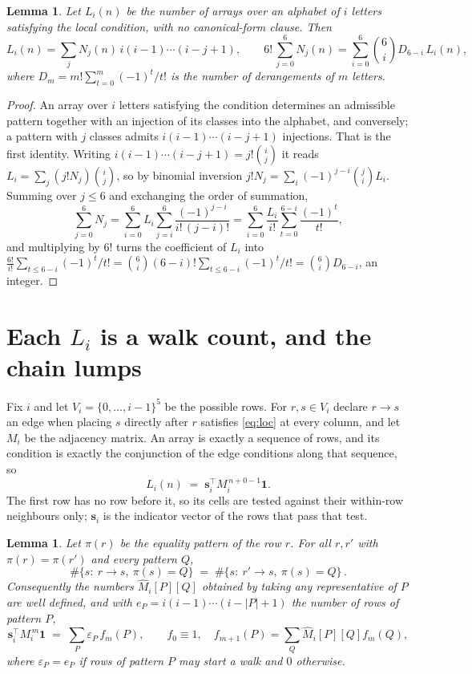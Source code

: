 \documentclass[11pt,a4paper]{article}
\theoremstyle{plain}
\newtheorem{lemma}[theorem]{Lemma}
\theoremstyle{definition}
\begin{document}
\begin{lemma}\label{lem:inv}
Let $L_i(n)$ be the number of arrays over an alphabet of $i$ letters satisfying the local
condition, with no canonical-form clause. Then
\[
L_i(n)=\sum_j N_j(n)\,i(i-1)\cdots(i-j+1),
\qquad
6!\,\sum_{j=0}^{6}N_j(n)=\sum_{i=0}^{6}\binom{6}{i}D_{6-i}\,L_i(n),
\]
where $D_m=m!\sum_{t=0}^{m}(-1)^t/t!$ is the number of derangements of $m$ letters.
\end{lemma}

\begin{proof}
An array over $i$ letters satisfying the condition determines an admissible pattern together
with an injection of its classes into the alphabet, and conversely; a pattern with $j$
classes admits $i(i-1)\cdots(i-j+1)$ injections. That is the first identity. Writing
$i(i-1)\cdots(i-j+1)=j!\binom{i}{j}$ it reads $L_i=\sum_j (j!N_j)\binom{i}{j}$, so by
binomial inversion $j!N_j=\sum_{i}(-1)^{j-i}\binom{j}{i}L_i$. Summing over
$j\le 6$ and exchanging the order of summation,
\[
\sum_{j=0}^{6}N_j=\sum_{i=0}^{6}L_i\sum_{j=i}^{6}\frac{(-1)^{j-i}}{i!\,(j-i)!}
=\sum_{i=0}^{6}\frac{L_i}{i!}\sum_{t=0}^{6-i}\frac{(-1)^t}{t!} ,
\]
and multiplying by $6!$ turns the coefficient of $L_i$ into
$\frac{6!}{i!}\sum_{t\le 6-i}(-1)^t/t!=\binom{6}{i}(6-i)!\sum_{t\le 6-i}(-1)^t/t!
=\binom{6}{i}D_{6-i}$, an integer.
\end{proof}

\section{Each $L_i$ is a walk count, and the chain lumps}

Fix $i$ and let $V_i=\{0,\dots,i-1\}^{5}$ be the possible rows. For $r,s\in V_i$
declare $r\to s$ an edge when placing $s$ directly after $r$ satisfies \eqref{eq:loc} at
every column, and let $M_i$ be the adjacency matrix. An array is exactly a sequence of
rows, and its condition is exactly the conjunction of the edge conditions along that
sequence, so
\[
L_i(n)\;=\;\mathbf{s}_i^{\!\top}M_i^{\,n+0-1}\mathbf{1} .
\]
The first row has no row before it, so its cells are tested
against their within-row neighbours only; $\mathbf{s}_i$ is the indicator vector of the
rows that pass that test.

\begin{lemma}\label{lem:lump}
Let $\pi(r)$ be the equality pattern of the row $r$. For all $r,r'$ with
$\pi(r)=\pi(r')$ and every pattern $Q$,
\[
\#\{s:\ r\to s,\ \pi(s)=Q\}\;=\;\#\{s:\ r'\to s,\ \pi(s)=Q\}\, .
\]
Consequently the numbers $\widehat M_i[P][Q]$ obtained by taking any representative of $P$
are well defined, and with $e_P=i(i-1)\cdots(i-|P|+1)$ the number of rows of pattern $P$,
\[
\mathbf{s}_i^{\!\top}M_i^{\,m}\mathbf{1}\;=\;\sum_P \varepsilon_P\,f_m(P),
\qquad f_0\equiv1,\quad f_{m+1}(P)=\sum_Q\widehat M_i[P][Q]f_m(Q),
\]
where $\varepsilon_P=e_P$ if rows of pattern $P$ may start a walk and $0$ otherwise.
\end{lemma}
\end{document}
